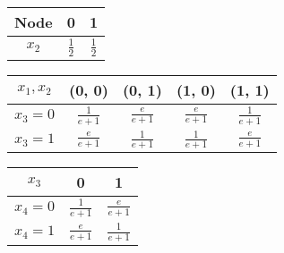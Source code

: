 \begin{table}[h!]
    \centering
    \begin{tabular}{|c|c|c|}
    \hline
    \textbf{Node} & \textbf{0} & \textbf{1} \\ \hline
    $x_2$         & $\frac{1}{2}$ & $\frac{1}{2}$ \\ \hline
    \end{tabular}
\end{table}
    
\begin{table}[h!]
    \centering
    \begin{tabular}{|c|c|c|c|c|}
    \hline
    \textbf{$x_1, x_2$} & \textbf{(0, 0)} & \textbf{(0, 1)} & \textbf{(1, 0)} & \textbf{(1, 1)}\\ \hline
    $x_3=0$         & $\frac{1}{e+1}$ & $\frac{e}{e+1}$ & $\frac{e}{e+1}$ & $\frac{1}{e+1}$\\ \hline
    $x_3=1$ & $\frac{e}{e+1}$ & $\frac{1}{e+1}$ & $\frac{1}{e+1}$ & $\frac{e}{e+1}$\\ \hline
\end{tabular}
\end{table}

\begin{table}[h!]
    \centering
    \begin{tabular}{|c|c|c|}
    \hline
    \textbf{$x_3$} & \textbf{0} & \textbf{1}\\ \hline
    $x_4=0$ & $\frac{1}{e+1}$ & $\frac{e}{e+1}$\\ \hline
    $x_4=1$ & $\frac{e}{e+1}$ & $\frac{1}{e+1}$\\ \hline
\end{tabular}
\end{table}
